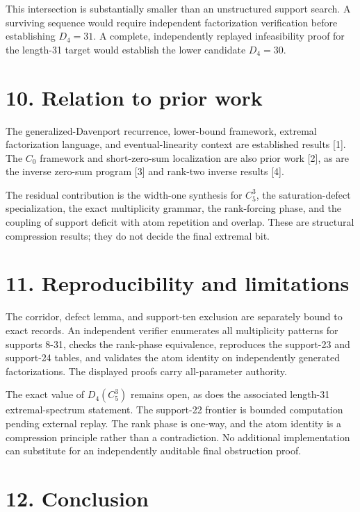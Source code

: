 \documentclass[
  11pt,
]{article}
\begin{document}
This intersection is substantially smaller than an unstructured support
search. A surviving sequence would require independent factorization
verification before establishing \(D_4=31\). A complete, independently
replayed infeasibility proof for the length-31 target would establish
the lower candidate \(D_4=30\).

\hypertarget{relation-to-prior-work}{%
\section{10. Relation to prior work}\label{relation-to-prior-work}}

The generalized-Davenport recurrence, lower-bound framework, extremal
factorization language, and eventual-linearity context are established
results {[}1{]}. The \(C_0\) framework and short-zero-sum localization
are also prior work {[}2{]}, as are the inverse zero-sum program {[}3{]}
and rank-two inverse results {[}4{]}.

The residual contribution is the width-one synthesis for \(C_5^3\), the
saturation-defect specialization, the exact multiplicity grammar, the
rank-forcing phase, and the coupling of support deficit with atom
repetition and overlap. These are structural compression results; they
do not decide the final extremal bit.

\hypertarget{reproducibility-and-limitations}{%
\section{11. Reproducibility and
limitations}\label{reproducibility-and-limitations}}

The corridor, defect lemma, and support-ten exclusion are separately
bound to exact records. An independent verifier enumerates all
multiplicity patterns for supports 8-31, checks the rank-phase
equivalence, reproduces the support-23 and support-24 tables, and
validates the atom identity on independently generated factorizations.
The displayed proofs carry all-parameter authority.

The exact value of \(D_4(C_5^3)\) remains open, as does the associated
length-31 extremal-spectrum statement. The support-22 frontier is
bounded computation pending external replay. The rank phase is one-way,
and the atom identity is a compression principle rather than a
contradiction. No additional implementation can substitute for an
independently auditable final obstruction proof.

\hypertarget{conclusion}{%
\section{12. Conclusion}\label{conclusion}}
\end{document}
